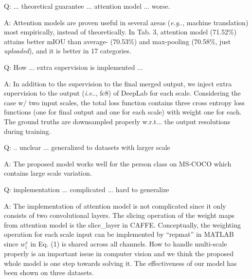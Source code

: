 \documentclass[10pt,twocolumn,letterpaper]{article}
\makeatletter
\def\@onedot{\ifx\@let@token.\else.\null\fi\xspace}
\DeclareRobustCommand\onedot{\futurelet\@let@token\@onedot}
\def\eg{\emph{e.g}\onedot} \def\Eg{\emph{E.g}\onedot}
\def\ie{\emph{i.e}\onedot} \def\Ie{\emph{I.e}\onedot}
\def\wrt{w.r.t\onedot} \def\dof{d.o.f\onedot}
\makeatother
\begin{document}
Q: ... theoretical guarantee ... attention model ... worse.

A: Attention models are proven useful in several areas (\eg, machine translation) most empirically, instead of theoretically. In Tab. 3, attention model (71.52\%) attains better mIOU than average- (70.53\%) and max-pooling (70.58\%, just {\it uploaded}), and it is better in 17 categories.

Q: How ... extra supervision is implemented ...

A: In addition to the supervision to the final merged output, we inject extra supervision to the output (\ie, fc8) of DeepLab for each scale. Considering the case w/ two input scales, the total loss function contains three cross entropy loss functions (one for final output and one for each scale) with weight one for each. The ground truths are downsampled properly \wrt. the output resolutions during training.

Q: .. unclear ... generalized to datasets with larger scale

A: The proposed model works well for the person class on MS-COCO which contains large scale variation.



Q: implementation ... complicated ... hard to generalize

A: The implementation of attention model is not complicated since it only consists of two convolutional layers. The slicing operation of the weight maps from attention model is the slice\_layer in CAFFE. Conceptually, the weighting operation for each scale input can be implemented by ``repmat'' in MATLAB since $w_i^s$ in Eq. (1) is shared across all channels. How to handle multi-scale properly is an important issue in computer vision and we think the proposed whole model is one step towards solving it. The effectiveness of our model has been shown on three datasets. %

\end{document}
